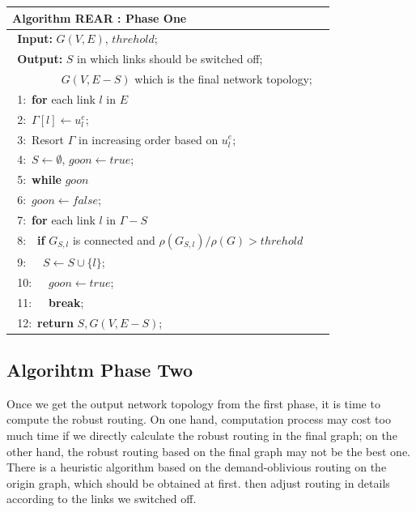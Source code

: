 \documentclass[conference]{IEEEtran}
\begin{document}
\begin{table}[!th]
\begin{tabular}{ll}
\hline
\textbf{Algorithm REAR : Phase One}\\
\hline
$\:\:$\textbf{Input:} $G(V, E)$, $threhold$;\\
$\:\:$\textbf{Output:} $S$ in which links should be switched off;\\
$\quad\qquad\quad$ $G(V, E-S)$ which is the final network topology;\\
$\:\:$1:\ \textbf{for} {each link $l$ in $E$}\\
$\:\:$2:\quad\ $\Gamma[l] \leftarrow u^e_l$;\\
$\:\:$3:\ Resort $\Gamma$ in increasing order based on $u^e_l$;\\
$\:\:$4:\ $S \leftarrow \emptyset$, $goon \leftarrow true$;\\
$\:\:$5:\ \textbf{while} {$goon$}\\
$\:\:$6:\quad\  $goon \leftarrow false$;\\
$\:\:$7:\quad\ \textbf{for} {each link $l$ in $\Gamma - S$}\\
$\:\:$8:\quad\ \quad\ \textbf{if} $G_{S,l}$ is connected and $\rho(G_{S,l})/\rho(G)>threhold$\\
$\:\:$9:\quad\ \quad\ \quad\ $S \leftarrow S \cup \{l\}$;\\
$\:\:$10:\quad\ \quad\ \quad\ $goon \leftarrow true$;\\
$\:\:$11:\quad\ \quad\ \quad\ \textbf{break};\\
$\:\:$12:\ \textbf{return} $S, G(V, E-S)$;\\
\hline
\end{tabular}
\end{table}



\subsection{Algorihtm Phase Two}
Once we get the output network topology from the first phase, it is time to compute
the robust routing. On one hand, computation process may cost too much time if we directly calculate the robust routing in
the final graph; on the other hand, the robust routing based on the final graph may not be the best one.
There is a heuristic algorithm
based on the demand-oblivious routing on the origin graph, which should be obtained at first.
then adjust routing in details according to the links we switched off.
\end{document}
